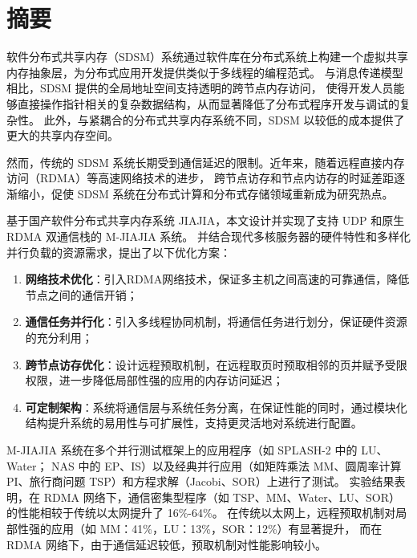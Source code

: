 
\maketitle%
\MAKETITLE%
\makedeclaration%
\intobmk\chapter*{摘\quad 要}%
\setcounter{page}{1}%

软件分布式共享内存（SDSM）系统通过软件库在分布式系统上构建一个虚拟共享内存抽象层，为分布式应用开发提供类似于多线程的编程范式。
与消息传递模型相比，SDSM 提供的全局地址空间支持透明的跨节点内存访问，
使得开发人员能够直接操作指针相关的复杂数据结构，从而显著降低了分布式程序开发与调试的复杂性。
此外，与紧耦合的分布式共享内存系统不同，SDSM 以较低的成本提供了更大的共享内存空间。

然而，传统的 SDSM 系统长期受到通信延迟的限制。近年来，随着远程直接内存访问（RDMA）等高速网络技术的进步，
跨节点访存和节点内访存的时延差距逐渐缩小，促使 SDSM 系统在分布式计算和分布式存储领域重新成为研究热点。

基于国产软件分布式共享内存系统 JIAJIA，本文设计并实现了支持 UDP 和原生 RDMA 双通信栈的 M-JIAJIA 系统。
并结合现代多核服务器的硬件特性和多样化并行负载的资源需求，提出了以下优化方案：

\begin{enumerate}[label=\arabic*.]
    \item \textbf{网络技术优化}：引入RDMA网络技术，保证多主机之间高速的可靠通信，降低节点之间的通信开销；
    \item \textbf{通信任务并行化}：引入多线程协同机制，将通信任务进行划分，保证硬件资源的充分利用；
    \item \textbf{跨节点访存优化}：设计远程预取机制，在远程取页时预取相邻的页并赋予受限权限，进一步降低局部性强的应用的内存访问延迟；
    \item \textbf{可定制架构}：系统将通信层与系统任务分离，在保证性能的同时，通过模块化结构提升系统的易用性与可扩展性，支持更灵活地对系统进行配置。
\end{enumerate}

M-JIAJIA 系统在多个并行测试框架上的应用程序（如 SPLASH-2 中的 LU、Water；
NAS 中的 EP、IS）以及经典并行应用（如矩阵乘法 MM、圆周率计算 PI、旅行商问题 TSP）和方程求解（Jacobi、SOR）上进行了测试。
实验结果表明，在 RDMA 网络下，通信密集型程序（如 TSP、MM、Water、LU、SOR）的性能相较于传统以太网提升了 16\%-64\%。
在传统以太网上，远程预取机制对局部性强的应用（如 MM：41\%，LU：13\%，SOR：12\%）有显著提升，
而在 RDMA 网络下，由于通信延迟较低，预取机制对性能影响较小。

